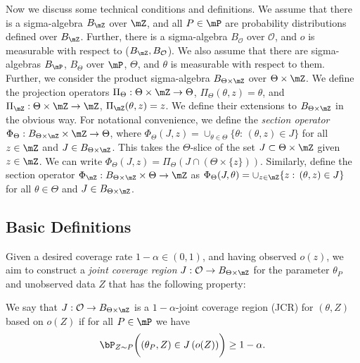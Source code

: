 \documentclass[english]{article}
\begin{document}
Now we discuss some technical conditions and definitions.
We assume that there is a sigma-algebra $B_\mZ$ over $\mZ$, and all $P\in\mP$ are probability distributions defined over $B_\mZ$.
Further, there is a sigma-algebra $B_\mathcal{O}$ over $\mathcal{O}$, and $o$ is measurable with respect to ($B_\mZ,B_\mathcal{O}$).
We also assume that there are sigma-algebras $B_\mP$, $B_\Theta$ over $\mP$, $\Theta$, and $\theta$ is measurable with respect to them.
Further, we consider the product sigma-algebra $B_{\Theta \times \mZ}$ over $\Theta \times \mZ$.
We define the projection operators $\Pi_{ \Theta}: \Theta \times \mZ\to  \Theta$, $\Pi_{ \Theta}(\theta,z)=\theta$, and
$\Pi_{\mZ}: \Theta \times \mZ\to \mZ$, $\Pi_{\mZ}(\theta,z)=z$.
We define their extensions to $B_{\Theta \times \mZ}$ in the obvious way.
For notational convenience, we define the \emph{section operator} $\Phi_{\Theta}: B_{\Theta \times \mZ} \times \mZ \to \Theta$, where $\Phi_{\Theta}(J,z) = \cup_{\theta \in \Theta} \{\theta:\, (\theta,z) \in J \}$ for all $z \in \mZ$ and $J \in B_{\Theta \times \mZ}$. 
This takes the $\Theta$-slice of the set $J\subset \Theta \times \mZ$ given $z\in \mZ$.
We can write $\Phi_{\Theta}(J,z) = \Pi_\Theta(J\cap (\Theta\times\{z\}) )$.
Similarly, define the section operator $\Phi_{\mZ}: B_{\Theta \times \mZ} \times \Theta \to \mZ$ as $\Phi_{\Theta}(J,\theta) = \cup_{z \in \mZ} \{z:\, (\theta,z) \in J \}$ for all $\theta \in \Theta$ and $J \in B_{\Theta \times \mZ}$.

\subsection{Basic Definitions}

Given a desired coverage rate $1 - \alpha \in (0,1)$, 
and having observed $o(z)$,
we aim to construct a \emph{joint coverage region} $J:\mathcal{O} \rightarrow  B_{\Theta \times \mZ}$ for the parameter $\theta_P$ and unobserved data $Z$ that has the following property:

\begin{definition}%
     We say that $J:\mathcal{O} \rightarrow  B_{\Theta \times \mZ}$ is a $1-\alpha$-joint coverage region (JCR) for $(\theta,Z)$ based on $o(Z)$ if for all $P \in \mP$ we have
\begin{equation}\label{eq:J}
    \bP_{Z \sim P}\biggl(\left(\theta_P, Z\right) \in J\left( o(Z)\right)\biggr) \ge 1 - \alpha.
\end{equation}
\end{definition}
\end{document}
